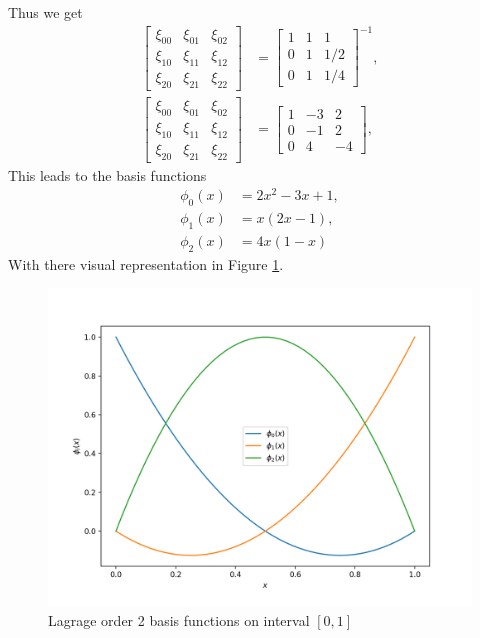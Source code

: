 \documentclass[12pt,a4paper]{article}
\begin{document}
Thus we get 
\begin{align}
\left[ \begin{matrix}
\xi_{00} & \xi_{01} & \xi_{02} \\
\xi_{10} & \xi_{11} & \xi_{12} \\
\xi_{20} & \xi_{21} & \xi_{22} 
\end{matrix} \right] &= 
\left[ \begin{matrix}
1 & 1 & 1 \\
0 & 1 & 1/2 \\
0 & 1 & 1/4
\end{matrix} \right]^{-1}, \\
\left[ \begin{matrix}
\xi_{00} & \xi_{01} & \xi_{02} \\
\xi_{10} & \xi_{11} & \xi_{12} \\
\xi_{20} & \xi_{21} & \xi_{22} 
\end{matrix} \right] &= 
\left[ \begin{matrix}
1 & -3 & 2 \\
0 & -1 & 2 \\
0 & 4 & -4
\end{matrix} \right],
\end{align}
This leads to the basis functions
\begin{align}
\phi_0(x) &= 2x^2-3x+1,\\
\phi_1(x) &= x(2x-1),\\
\phi_2(x) &= 4x(1-x)
\end{align}
With there visual representation in Figure \ref{InterFuncs}.
\begin{figure}[H]
     \includegraphics[width=\textwidth]{Pics/BasisFunc/IntervalFuncs.png}
     \caption{Lagrage order 2 basis functions  on interval $[0,1]$}
     \label{InterFuncs}
\end{figure}
\end{document}
